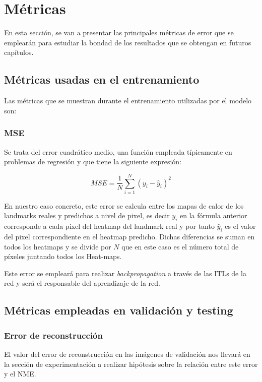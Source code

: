 \section{Métricas}

\noindent En esta sección, se van a presentar las principales métricas de error que se emplearán para estudiar la bondad de los resultados que se obtengan en futuros capítulos.

    \subsection{Métricas usadas en el entrenamiento}
        \noindent Las métricas que se muestran durante el entrenamiento utilizadas por el modelo son:

        \subsubsection{MSE}
            \noindent Se trata del error cuadrático medio, una función empleada típicamente en problemas de regresión y que tiene la siguiente expresión: 

            \begin{equation}
                MSE = \frac{1}{N} \sum_{i=1}^{N} (y_i - \widehat{y}_i)^2
            \end{equation}

            \noindent En nuestro caso concreto, este error se calcula entre los mapas de calor de los landmarks reales y predichos a nivel de pixel, es decir $y_i$ en la fórmula anterior corresponde a cada pixel del heatmap del landmark real y por tanto $\widehat{y}_i$ es el valor del pixel correspondiente en el heatmap predicho. Dichas diferencias se suman en todos los heatmaps y se divide por $N$ que en este caso es el número total de píxeles juntando todos los Heat-maps.

            \medskip

            \noindent Este error se empleará para realizar \textit{backpropagation} a través de las ITLs de la red y será el responsable del aprendizaje de la red.

    \subsection{Métricas empleadas en validación y testing}

        \subsubsection{Error de reconstrucción}
            \noindent El valor del error de reconstrucción en las imágenes de validación nos llevará en la sección de experimentación a realizar hipótesis sobre la relación entre este error y el NME.


